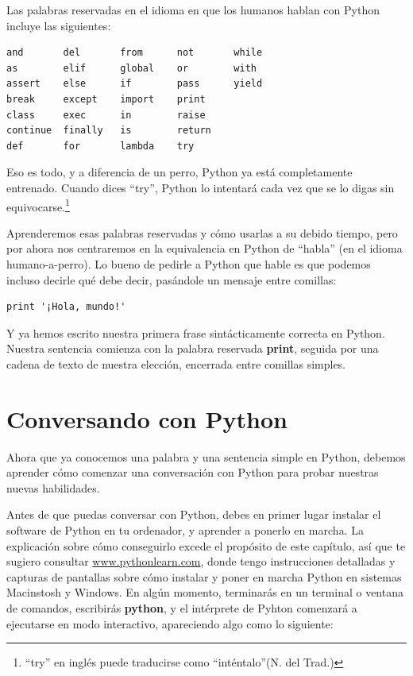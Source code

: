 Las palabras reservadas en el idioma en que los humanos hablan con
Python incluye las siguientes:

\beforeverb
\begin{verbatim}
and       del       from      not       while    
as        elif      global    or        with     
assert    else      if        pass      yield    
break     except    import    print              
class     exec      in        raise              
continue  finally   is        return             
def       for       lambda    try
\end{verbatim}
\afterverb
%
Eso es todo, y a diferencia de un perro, Python ya está completamente entrenado.
Cuando dices ``try'', Python lo intentará cada vez que se lo digas sin
equivocarse.\footnote{``try'' en inglés puede traducirse como ``inténtalo''(N. del Trad.)}

Aprenderemos esas palabras reservadas y cómo usarlas a su debido tiempo,
pero por ahora nos centraremos en la equivalencia en Python de ``habla''
(en el idioma humano-a-perro). Lo bueno de pedirle a Python que hable
es que podemos incluso decirle qué debe decir, pasándole un mensaje entre comillas:

\beforeverb
\begin{verbatim}
print '¡Hola, mundo!'
\end{verbatim}
\afterverb

Y ya hemos escrito nuestra primera frase sintácticamente correcta en Python.
Nuestra sentencia comienza con la palabra reservada {\bf print}, seguida
por una cadena de texto de nuestra elección, encerrada entre comillas simples.

\section{Conversando con Python}

Ahora que ya conocemos una palabra y una sentencia simple en Python,
debemos aprender cómo comenzar una conversación con Python para probar
nuestras nuevas habilidades.

Antes de que puedas conversar con Python, debes en primer lugar instalar
el software de Python en tu ordenador, y aprender a ponerlo en marcha.
La explicación sobre cómo conseguirlo excede el propósito de este capítulo,
así que te sugiero consultar \url{www.pythonlearn.com}, donde tengo
instrucciones detalladas y capturas de pantallas sobre cómo instalar y poner en marcha
Python en sistemas Macinstosh y Windows. En algún momento, terminarás en un terminal
o ventana de comandos, escribirás {\bf python}, y el intérprete de Pyhton
comenzará a ejecutarse en modo interactivo, apareciendo algo como lo siguiente:

